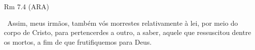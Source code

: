 \documentclass[12pt,aspectratio=169]{beamer}
\newcommand{\ver}[1]{%
    \raisebox{0.50ex}{%
        \scalebox{1.1}{%
            \pmb{\textbf{\textcolor{BSpbg}{#1}}}%
        }%
    }%
}
\newcommand{\QUOTE}[1]{%
    \par\noindent\hspace*{0.05\linewidth}%
    \begin{minipage}{0.9\linewidth}%
        \linespread{1.35}\large{#1}%
    \end{minipage}%
}
\newcommand{\YEL}[1]{{\textcolor{TXyel}{#1}}}
\newcommand{\GRE}[1]{{\textcolor{TXgre}{#1}}}
\newcommand{\MAG}[1]{{\textcolor{TXmag}{#1}}}
\begin{document}

    \begin{frame}{Rm 7.4 (ARA)}
        \QUOTE{%
            \ver{4}~Assim, meus irmãos, também vós \YEL{morrestes relativamente à lei}, \MAG{por
            meio do corpo de Cristo}, para pertencerdes a outro, a saber, aquele que ressuscitou
            dentre os mortos, a fim de que \GRE{frutifiquemos para Deus}.
        }
    \end{frame}

\end{document}
